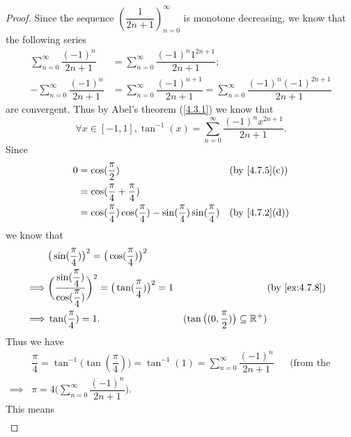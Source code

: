 \begin{proof}
  Since the sequence \((\dfrac{1}{2n + 1})_{n = 0}^\infty\) is monotone decreasing, we know that the following series
  \begin{align*}
    \sum_{n = 0}^\infty \dfrac{(-1)^n}{2n + 1}  & = \sum_{n = 0}^\infty \dfrac{(-1)^n 1^{2n + 1}}{2n + 1};                                                      \\
    -\sum_{n = 0}^\infty \dfrac{(-1)^n}{2n + 1} & = \sum_{n = 0}^\infty \dfrac{(-1)^{n + 1}}{2n + 1} = \sum_{n = 0}^\infty \dfrac{(-1)^n (-1)^{2n + 1}}{2n + 1}
  \end{align*}
  are convergent.
  Thus by Abel's theorem (\cref{4.3.1}) we know that
  \[
    \forall x \in [-1, 1], \tan^{-1}(x) = \sum_{n = 0}^\infty \dfrac{(-1)^n x^{2n + 1}}{2n + 1}.
  \]
  Since
  \begin{align*}
    0 & = \cos(\dfrac{\pi}{2})                                                                  &  & \text{(by \cref{4.7.5}(c))} \\
      & = \cos(\dfrac{\pi}{4} + \dfrac{\pi}{4})                                                                                  \\
      & = \cos(\dfrac{\pi}{4}) \cos(\dfrac{\pi}{4}) - \sin(\dfrac{\pi}{4}) \sin(\dfrac{\pi}{4}) &  & \text{(by \cref{4.7.2}(d))}
  \end{align*}
  we know that
  \begin{align*}
             & \big(\sin(\dfrac{\pi}{4})\big)^2 = \big(\cos(\dfrac{\pi}{4})\big)^2                                                                                                                        \\
    \implies & \bigg(\dfrac{\sin(\dfrac{\pi}{4})}{\cos(\dfrac{\pi}{4})}\bigg)^2 = \big(\tan(\dfrac{\pi}{4})\big)^2 = 1 &                                                    & \text{(by \cref{ex:4.7.8})} \\
    \implies & \tan(\dfrac{\pi}{4}) = 1.                                                                               & (\tan\big((0, \dfrac{\pi}{2})\big) \subseteq \R^+)
  \end{align*}
  Thus we have
  \begin{align*}
             & \dfrac{\pi}{4} = \tan^{-1}\big(\tan(\dfrac{\pi}{4})\big) = \tan^{-1}(1) = \sum_{n = 0}^\infty \dfrac{(-1)^n}{2n + 1} &  & \text{(from the proof above)} \\
    \implies & \pi = 4 \bigg(\sum_{n = 0}^\infty \dfrac{(-1)^n}{2n + 1}\bigg).
  \end{align*}
  This means
  \begin{align*}

\end{align*}
\end{proof}
